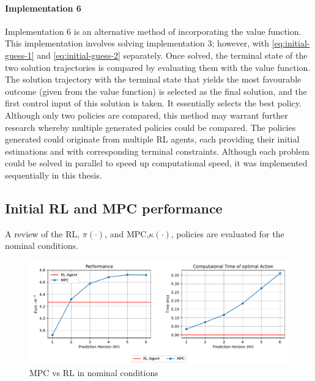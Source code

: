 \paragraph{Implementation 6}
Implementation 6 is an alternative method of incorporating the value function. This implementation involves solving implementation 3; however, with \autoref{eq:initial-guess-1} and \autoref{eq:initial-guess-2} separately. Once solved, the terminal state of the two solution trajectories is compared by evaluating them with the value function. The solution trajectory with the terminal state that yields the most favourable outcome (given from the value function) is selected as the final solution, and the first control input of this solution is taken. It essentially selects the best policy. Although only two policies are compared, this method may warrant further research whereby multiple generated policies could be compared. The policies generated could originate from multiple RL agents, each providing their initial estimations and with corresponding terminal constraints. Although each problem could be solved in parallel to speed up computational speed, it was implemented sequentially in this thesis.



\subsection{Initial RL and MPC performance}
A review of the RL, $\pi(\cdot)$, and MPC,$\kappa(\cdot)$, policies are evaluated for the nominal conditions.


\begin{figure}[H]
	\centering
	\includegraphics[width=\textwidth]{figures/mpc_vs_rl_nominal.pdf}
	\caption{MPC vs RL in nominal conditions}
	\label{fig:rl-vs-mpc-nominal}
\end{figure}


